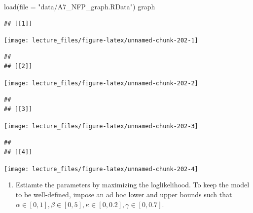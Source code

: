 \documentclass[
]{book}
\newenvironment{Shaded}{\begin{snugshade}}{\end{snugshade}}
\newcommand{\AttributeTok}[1]{\textcolor[rgb]{0.77,0.63,0.00}{#1}}
\newcommand{\FunctionTok}[1]{\textcolor[rgb]{0.00,0.00,0.00}{#1}}
\newcommand{\NormalTok}[1]{#1}
\newcommand{\StringTok}[1]{\textcolor[rgb]{0.31,0.60,0.02}{#1}}
\providecommand{\tightlist}{%
  \setlength{\itemsep}{0pt}\setlength{\parskip}{0pt}}
\begin{document}
\begin{Shaded}
\begin{Highlighting}[]
\FunctionTok{load}\NormalTok{(}\AttributeTok{file =} \StringTok{"data/A7\_NFP\_graph.RData"}\NormalTok{)}
\NormalTok{graph}
\end{Highlighting}
\end{Shaded}

\begin{verbatim}
## [[1]]
\end{verbatim}

\begin{center}\texttt{[image: lecture\_files/figure-latex/unnamed-chunk-202-1]} \end{center}

\begin{verbatim}
## 
## [[2]]
\end{verbatim}

\begin{center}\texttt{[image: lecture\_files/figure-latex/unnamed-chunk-202-2]} \end{center}

\begin{verbatim}
## 
## [[3]]
\end{verbatim}

\begin{center}\texttt{[image: lecture\_files/figure-latex/unnamed-chunk-202-3]} \end{center}

\begin{verbatim}
## 
## [[4]]
\end{verbatim}

\begin{center}\texttt{[image: lecture\_files/figure-latex/unnamed-chunk-202-4]} \end{center}

\begin{enumerate}
\def\labelenumi{\arabic{enumi}.}
\setcounter{enumi}{3}
\tightlist
\item
  Estiamte the parameters by maximizing the loglikelihood. To keep the model to be well-defined, impose an ad hoc lower and upper bounds such that \(\alpha \in [0, 1], \beta \in [0, 5], \kappa \in [0, 0.2], \gamma \in [0, 0.7]\).
\end{enumerate}
\end{document}
